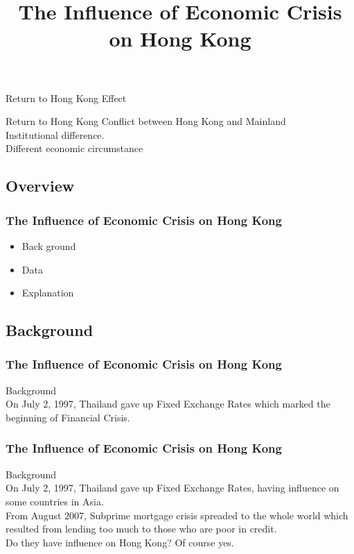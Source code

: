 \documentclass[slidestop,uncompress,mathsans, 12pt]{beamer}
\begin{document}
\begin{frame}{Return to Hong Kong}
Effect
\begin{block}{}
\end{block}
\end{frame}
\begin{frame}{Return to Hong Kong}
Conflict between Hong Kong and Mainland\\
\bigskip
\bigskip
Institutional difference.\\
\bigskip
\bigskip
Different economic circumstance 

\end{frame}
\subsection{Overview}
\begin{frame}
\title{The Influence of Economic Crisis on Hong Kong }
\date{}
\titlepage
\end{frame}
\begin{frame}[shrink]
\frametitle{The Influence of Economic Crisis on Hong Kong 
}
\begin{itemize}
\item Back	ground
\bigskip
\item Data
\bigskip
\item Explanation
\end{itemize}
\end{frame}
\pageTransitionSplitVI
\subsection{Background}
\begin{frame}

\frametitle{The Influence of Economic Crisis on Hong Kong }
Background\\
\bigskip
\transglitter[direction=315]
On July 2, 1997, Thailand gave up Fixed Exchange Rates which marked the beginning of Financial Crisis.\\
\end{frame}
\begin{frame}
\frametitle{The Influence of Economic Crisis on Hong Kong }
Background\\
\bigskip
On July 2, 1997, Thailand gave up Fixed Exchange Rates, having influence on some countries in Asia.\\
\bigskip
{}
From August 2007, Subprime mortgage crisis spreaded to the whole world which resulted from lending too much to those who are poor in credit.\\
\bigskip
Do they have influence on Hong Kong? Of course yes.
\end{frame}
\end{document}

